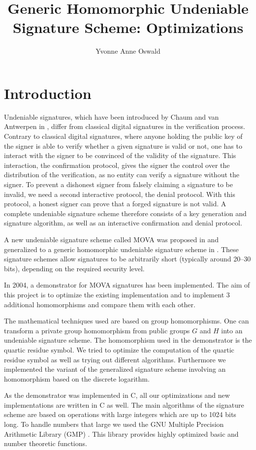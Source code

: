 \documentclass[a4paper, 11pt]{article}
\author{Yvonne Anne Oswald}
\title{Generic Homomorphic Undeniable Signature Scheme: Optimizations}
\begin{document}
 
  
 
 \tableofcontents 
 \listoftables 
 \newpage 
 
 \section{Introduction} 
 Undeniable signatures, which have been introduced by Chaum and van Antwerpen in \cite{chaum}, differ from classical digital signatures in the verification process. Contrary to classical digital signatures, where anyone holding the public key of the signer is able to verify whether a given signature is valid or not, one has to interact with the signer to be convinced of the validity of the signature. This interaction, the confirmation protocol, gives the signer the control over the distribution of the verification, as no entity can verify a signature without the signer. 
 To prevent a dishonest signer from falsely claiming a signature to be invalid, we need a second interactive protocol, the denial protocol. With this protocol, a honest signer can prove that a forged signature is not valid. A complete undeniable signature scheme therefore consists of a key generation and signature algorithm, as well as an interactive confirmation and denial protocol. 
 
 A new undeniable signature scheme called MOVA was proposed in 
 \cite{howMOVA} and generalized to a generic homomorphic undeniable 
 signature scheme in \cite{genMOVA}. These signature schemes allow 
 signatures to be arbitrarily short (typically around 20--30 bits), depending on the required security level. 
 
 In 2004, a demonstrator for MOVA signatures has been implemented. The aim of this project is to optimize the existing implementation and to implement 3 additional homomorphisms and compare them with each other. 
 
 The mathematical techniques used are based on group homomorphisms. One can transform a private 
 group homomorphism from public groups $G$ and $H$ into an undeniable signature scheme. The homomorphism used in the 
 demonstrator is the quartic residue symbol. We tried to optimize the computation of the quartic residue 
 symbol as well as trying out different algorithms. Furthermore we implemented the variant of the generalized 
 signature scheme involving an homomorphism based on the discrete logarithm. 
 
 As the demonstrator was implemented in C, all our optimizations and new implementations are written in C as well. The main algorithms of the signature scheme are based on operations with large integers which are up to 1024 bits long. To handle numbers that large we used the GNU Multiple Precision Arithmetic Library (GMP) \cite{gmp}. This library provides highly optimized basic and number theoretic functions. 
 
\end{document}
